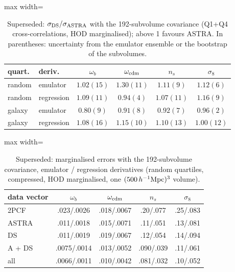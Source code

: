 \begin{table}[!htbp]
\centering\small
\begin{adjustbox}{max width=\linewidth}
\begin{tabular}{llcccc}
\toprule
quart. & deriv. & $\omega_b$ & $\omega_{\rm cdm}$ & $n_s$ & $\sigma_8$ \\
\midrule
random & emulator & $1.02(15)$ & $1.30(11)$ & $1.11(9)$ & $1.12(6)$ \\
random & regression & $1.09(11)$ & $0.94(4)$ & $1.07(11)$ & $1.16(9)$ \\
galaxy & emulator & $0.80(9)$ & $0.91(8)$ & $0.92(7)$ & $0.96(2)$ \\
galaxy & regression & $1.08(16)$ & $1.15(10)$ & $1.10(13)$ & $1.00(12)$ \\
\bottomrule
\end{tabular}
\end{adjustbox}
\caption{Superseded: $\sigma_{\rm DS}/\sigma_{\rm ASTRA}$ with the 192-subvolume covariance (Q1+Q4 cross-correlations, HOD marginalised); above 1 favours ASTRA. In parentheses: uncertainty from the emulator ensemble or the bootstrap of the subvolumes.}
\label{tab:ratio}
\end{table}

\begin{table}[!htbp]
\centering\small
\begin{adjustbox}{max width=\linewidth}
\begin{tabular}{lcccc}
\toprule
data vector & $\omega_b$ & $\omega_{\rm cdm}$ & $n_s$ & $\sigma_8$ \\
\midrule
2PCF & .023/.0026 & .018/.0067 & .20/.077 & .25/.083 \\
ASTRA & .011/.0018 & .015/.0071 & .11/.051 & .13/.081 \\
DS & .011/.0019 & .019/.0067 & .12/.054 & .14/.094 \\
A + DS & .0075/.0014 & .013/.0052 & .090/.039 & .11/.061 \\
all & .0066/.0011 & .010/.0042 & .081/.032 & .10/.052 \\
\bottomrule
\end{tabular}
\end{adjustbox}
\caption{Superseded: marginalised errors with the 192-subvolume covariance, emulator / regression derivatives (random quartiles, compressed, HOD marginalised, one $(500\,h^{-1}\mathrm{Mpc})^3$ volume).}
\label{tab:sigma_sub}
\end{table}


